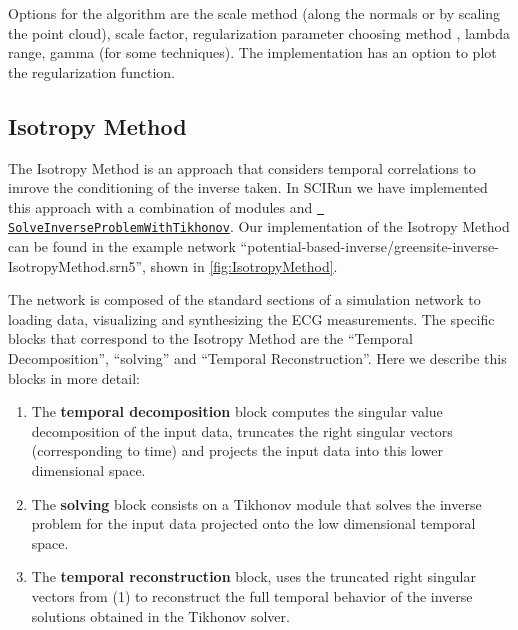 Options for the algorithm are the scale method (along the normals or
by scaling the point cloud), scale factor, regularization parameter
choosing method \cite{JDT:Joh2018}, lambda range, gamma (for some
techniques).  The implementation has an option to plot the
regularization function.




	
	
    
   
\subsection{Isotropy Method}

    The Isotropy Method is an approach that considers temporal correlations
    to imrove the conditioning of the inverse taken. In SCIRun we have
    implemented this approach with a combination of modules and
    \href{http://scirundocwiki.sci.utah.edu/SCIRunDocs/index.php/CIBC:Documentation:SCIRun:Reference:BioPSE:SolveInverseProblemWithTikhonov}{{\tt
    SolveInverseProblemWithTikhonov}}. Our implementation of the Isotropy
    Method can be found in the example network
    ``potential-based-inverse/greensite-inverse-IsotropyMethod.srn5'',
    shown in \autoref{fig:IsotropyMethod}.

    The network is composed of the standard sections of a simulation
    network to loading data, visualizing and synthesizing the ECG
    measurements. The specific blocks that correspond to the Isotropy
    Method are the ``Temporal Decomposition'', ``solving'' and ``Temporal
    Reconstruction''. Here we describe this blocks in more detail: 








    \begin{enumerate}
		\item The {\bf temporal decomposition} block computes the
		singular value decomposition of the input data, truncates the
		right singular vectors (corresponding to time) and projects
		the input data into this lower dimensional space.  
		\item The {\bf solving } block consists on a Tikhonov module
		that solves the inverse problem for the input data projected
		onto the low dimensional temporal space.
		\item The {\bf temporal reconstruction} block, uses the
		truncated right singular vectors from (1) to reconstruct the
		full temporal behavior of the inverse solutions obtained in
		the Tikhonov solver.
    \end{enumerate}

